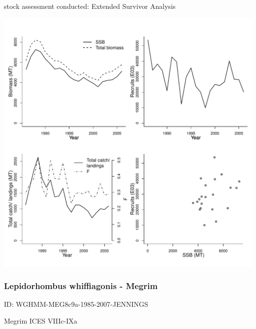stock assessment conducted: Extended Survivor Analysis 
\begin{center}
\vspace{-0.2cm}\includegraphics[scale=0.65]{../tex/figures/plot-WGHMM-FMEG8c9a-1986-2006-JENNINGS.pdf}
\end{center}

\newpage
\subsubsection{Lepidorhombus whiffiagonis - Megrim}
ID: WGHMM-MEG8c9a-1985-2007-JENNINGS

Megrim ICES VIIIc-IXa 

